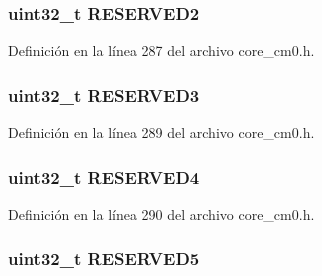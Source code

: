 \subsubsection[{\texorpdfstring{R\+E\+S\+E\+R\+V\+E\+D2}{RESERVED2}}]{\setlength{\rightskip}{0pt plus 5cm}uint32\+\_\+t R\+E\+S\+E\+R\+V\+E\+D2}\hypertarget{struct_n_v_i_c___type_a6e578ce633e8b80c70bc612a1bf8a965}{}\label{struct_n_v_i_c___type_a6e578ce633e8b80c70bc612a1bf8a965}


Definición en la línea 287 del archivo core\+\_\+cm0.\+h.

\subsubsection[{\texorpdfstring{R\+E\+S\+E\+R\+V\+E\+D3}{RESERVED3}}]{\setlength{\rightskip}{0pt plus 5cm}uint32\+\_\+t R\+E\+S\+E\+R\+V\+E\+D3}\hypertarget{struct_n_v_i_c___type_afbefcd166e59396eadde34d46bfc4539}{}\label{struct_n_v_i_c___type_afbefcd166e59396eadde34d46bfc4539}


Definición en la línea 289 del archivo core\+\_\+cm0.\+h.

\subsubsection[{\texorpdfstring{R\+E\+S\+E\+R\+V\+E\+D4}{RESERVED4}}]{\setlength{\rightskip}{0pt plus 5cm}uint32\+\_\+t R\+E\+S\+E\+R\+V\+E\+D4}\hypertarget{struct_n_v_i_c___type_aaed8c9afc755176cd51954c3056cc446}{}\label{struct_n_v_i_c___type_aaed8c9afc755176cd51954c3056cc446}


Definición en la línea 290 del archivo core\+\_\+cm0.\+h.

\subsubsection[{\texorpdfstring{R\+E\+S\+E\+R\+V\+E\+D5}{RESERVED5}}]{\setlength{\rightskip}{0pt plus 5cm}uint32\+\_\+t R\+E\+S\+E\+R\+V\+E\+D5}\hypertarget{struct_n_v_i_c___type_a46aeb40348124934bf802f01806b4f7f}{}\label{struct_n_v_i_c___type_a46aeb40348124934bf802f01806b4f7f}


